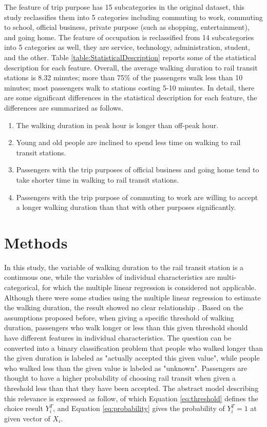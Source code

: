 \documentclass[Journal,letterpaper]{ascelike-new}
\begin{document}
The feature of trip purpose has 15 subcategories in the original dataset, this study reclassifies them into 5 categories including commuting to work, commuting to school, official business, private purpose (such as shopping, entertainment), and going home. The feature of occupation is reclassified from 14 subcategories into 5 categories as well, they are service, technology, administration, student, and the other. Table \ref{table:StatisticalDescription} reports some of the statistical description for each feature. Overall, the average walking duration to rail transit stations is 8.32 minutes; more than 75\% of the passengers walk less than 10 minutes; most passengers walk to stations costing 5-10 minutes. In detail, there are some significant differences in the statistical description for each feature, the differences are summarized as follows.
%
\begin{enumerate}
	\item The walking duration in peak hour is longer than off-peak hour.
	\item Young and old people are inclined to spend less time on walking to rail transit stations.
	\item Passengers with the trip purposes of official business and going home tend to take shorter time in walking to rail transit stations.
	\item Passengers with the trip purpose of commuting to work are willing to accept a longer walking duration than that with other purposes significantly.
\end{enumerate}

%
\section{Methods}
%
In this study, the variable of walking duration to the rail transit station is a continuous one, while the variables of individual characteristics are multi-categorical, for which the multiple linear regression is considered not applicable. Although there were some studies using the multiple linear regression to estimate the walking duration, the result showed no clear relationship \cite{krygsman2004multimodal}. Based on the assumptions proposed before, when giving a specific threshold of walking duration, passengers who walk longer or less than this given threshold should have different features in individual characteristics. The question can be converted into a binary classification problem that people who walked longer than the given duration is labeled as "actually accepted this given value", while people who walked less than the given value is labeled as "unknown". Passengers are thought to have a higher probability of choosing rail transit when given a threshold less than that they have been accepted. The abstract model describing this relevance is expressed as follow, of which Equation \ref{eq:threshold} defines the choice result $Y^T_i$, and Equation \ref{eq:probability} gives the probability of $Y^T_i=1$ at given vector of $X_i$.
\end{document}
